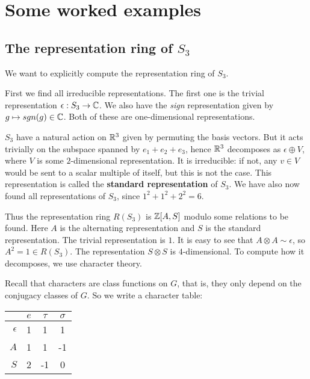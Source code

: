 \documentclass[11pt, english]{article}
\begin{document}
\newpage
\section{Some worked examples}

\subsection{The representation ring of $S_3$}

We want to explicitly compute the representation ring of $S_3$.

First we find all irreducible representations. The first one is the trivial representation $\epsilon:S_3 \to \mathbb{C}$. We also have the \emph{sign} representation given by $g \mapsto  sgn(g) \in \mathbb{C} $. Both of these are one-dimensional representations.

$S_3$ have a natural action on $\mathbb{R}^3$ given by permuting the basis vectors. But it acts trivially on the subspace spanned by $e_1+e_2+e_3$, hence $\mathbb{R}^3$ decomposes as $\epsilon \oplus V$, where $V$ is some $2$-dimensional representation. It is irreducible: if not, any $v \in V$ would be sent to a scalar multiple of itself, but this is not the case. This representation is called the \textbf{standard representation} of $S_3$. We have also now found all representations of $S_3$, since $1^2+1^2+2^2=6$. 

Thus the representation ring $R(S_3)$ is $\mathbb{Z}[A,S]$ modulo some relations to be found. Here $A$ is the alternating representation and $S$ is the standard representation. The trivial representation is $1$. It is easy to see that $A \otimes A \sim \epsilon$, so $A^2=1 \in R(S_3)$. The representation $S \otimes S$ is $4$-dimensional. To compute how it decomposes, we use character theory.

Recall that characters are class functions on $G$, that is, they only depend on the conjugacy classes of $G$. So we write a character table:

\begin{center}
\begin{tabular}{ r | c c  c }
 & $e$ & $\tau$ & $\sigma$ \\
\hline
$\epsilon$ & 1 & 1 & 1  \\
$A$ & 1 & 1 & -1 \\
$S$ & 2 & -1 & 0 \\
\end{tabular}
\end{center}
\end{document}
